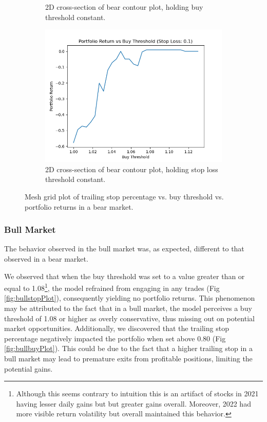 \documentclass{article}
\begin{document}
\begin{figure}[H]
\begin{subfigure}{0.495\textwidth}
        \caption{2D cross-section of bear contour plot, holding buy threshold constant.}
        \label{fig:buyPlot}
    \end{subfigure}
    \label{fig:parameters}
    \begin{subfigure}{0.495\textwidth}
        \centering
        \includegraphics[width=\linewidth]{stopSlice.png}
        \caption{2D cross-section of bear contour plot, holding stop loss threshold constant.}
        \label{fig:stopPlot}
    \end{subfigure}
    \caption{Mesh grid plot of trailing stop percentage vs. buy threshold vs. portfolio returns in a bear market.}

\end{figure}

\subsubsection{Bull Market}

The behavior observed in the bull market was, as expected, different to that observed in a bear market.

We observed that when the buy threshold was set to a value greater than or equal to 1.08\footnote{Although this seems contrary to intuition this is an artifact of stocks in 2021 having lesser daily gains but but greater gains overall. Moreover, 2022 had more visible return volatility but overall maintained this behavior.}, the model refrained from engaging in any trades (Fig \ref{fig:bullstopPlot}), consequently yielding no portfolio returns. This phenomenon may be attributed to the fact that in a bull market, the model perceives a buy threshold of 1.08 or higher as overly conservative, thus missing out on potential market opportunities. Additionally, we discovered that the trailing stop percentage negatively impacted the portfolio when set above 0.80 (Fig \ref{fig:bullbuyPlot}). This could be due to the fact that a higher trailing stop in a bull market may lead to premature exits from profitable positions, limiting the potential gains.
\end{document}
